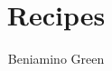 \documentclass{book}
\author{Beniamino Green}
\title{Recipes}
\begin{document}
\maketitle{}
\newpage


\end{document}
